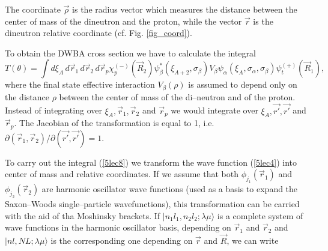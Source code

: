 \begin{subappendices}
The coordinate $\vec \rho$ is the radius vector which measures the distance between the center of mass of the dineutron and the proton, while the vector $\vec r$ is the dineutron relative coordinate (cf. Fig. \ref{fig_coord}).


To obtain the DWBA cross section we have to calculate the integral
\begin{equation}\label{5lec8}
T(\theta)=\int d\xi_A \,d\vec r_1 \,d\vec r_2 \,d\vec r_p \chi^{(-)}_p(\vec R_2) \psi^*_\beta(\xi_{A+2},\sigma_\beta) V_\beta \psi_\alpha(\xi_{A},\sigma_\alpha,\sigma_\beta)\psi_t^{(+)}(\vec R_1),
\end{equation}
where the final state effective interaction $V_\beta(\rho)$ is assumed to depend only on the distance $\rho$ between the center of mass of the di--neutron and of the proton. 
Instead of integrating over $\xi_{A},\vec r_1,\vec r_2$ and $\vec r_p$ we would integrate over $\xi_{A},\vec {r'},\vec {r'}$ and $\vec r_p$. The Jacobian of the transformation is equal to 1, i.e. $\partial (\vec r_1,\vec r_2)/\partial (\vec {r'},\vec {r'})=1$.


To carry out the integral (\ref{5lec8}) we transform the wave function (\ref{5lec4}) into center of mass and relative coordinates. If we assume that both $\phi_{j_1}(\vec r_1)$ and $\phi_{j_2}(\vec r_2)$ are harmonic oscillator wave functions (used as a basis to expand the Saxon--Woods single--particle wavefunctions), this transformation can be carried with the aid of tha Moshinsky brackets. If $| n_1 l_1,n_2 l_2; \lambda \mu \rangle$ is a complete system of wave functions in the harmonic oscillator basis, depending on $\vec r_1$ and $\vec r_2$ and $| n l,N L; \lambda \mu \rangle$ is the corresponding one depending on $\vec r$ and  $\vec R$, we can write


\end{subappendices}
